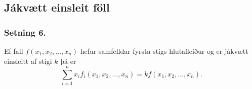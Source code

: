 \subsection{Jákvætt einsleit föll} 

\subsubsection{Setning 6.}
 Ef fall $f(x_1, x_2, \ldots, x_n)$ hefur samfelldar fyrsta stigs hlutafleiður og er jákvætt einsleitt af stigi $k$ þá er 
$$\sum_{i=1}^n x_if_i(x_1, x_2, \ldots, x_n)=kf(x_1, x_2, \ldots, x_n).$$ 
 




